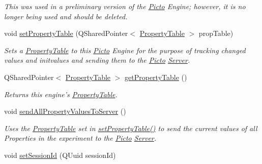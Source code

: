 \begin{DoxyCompactItemize}
\begin{DoxyCompactList}\small\item\em This was used in a preliminary version of the \hyperlink{namespace_picto}{Picto} Engine; however, it is no longer being used and should be deleted. \end{DoxyCompactList}\item 
\hypertarget{class_picto_1_1_engine_1_1_picto_engine_ac37ea79f55d34b89e4fa12ef68140f48}{void \hyperlink{class_picto_1_1_engine_1_1_picto_engine_ac37ea79f55d34b89e4fa12ef68140f48}{set\-Property\-Table} (Q\-Shared\-Pointer$<$ \hyperlink{class_picto_1_1_property_table}{Property\-Table} $>$ prop\-Table)}\label{class_picto_1_1_engine_1_1_picto_engine_ac37ea79f55d34b89e4fa12ef68140f48}

\begin{DoxyCompactList}\small\item\em Sets a \hyperlink{class_picto_1_1_property_table}{Property\-Table} to this \hyperlink{namespace_picto}{Picto} Engine for the purpose of tracking changed values and initvalues and sending them to the \hyperlink{namespace_picto}{Picto} \hyperlink{class_server}{Server}. \end{DoxyCompactList}\item 
Q\-Shared\-Pointer$<$ \hyperlink{class_picto_1_1_property_table}{Property\-Table} $>$ \hyperlink{class_picto_1_1_engine_1_1_picto_engine_a02ef204e6072d4186fbe7e8a50626e7c}{get\-Property\-Table} ()
\begin{DoxyCompactList}\small\item\em Returns this engine's \hyperlink{class_picto_1_1_property_table}{Property\-Table}. \end{DoxyCompactList}\item 
\hypertarget{class_picto_1_1_engine_1_1_picto_engine_a931c6fecf6f88d1f80849069d286c606}{void \hyperlink{class_picto_1_1_engine_1_1_picto_engine_a931c6fecf6f88d1f80849069d286c606}{send\-All\-Property\-Values\-To\-Server} ()}\label{class_picto_1_1_engine_1_1_picto_engine_a931c6fecf6f88d1f80849069d286c606}

\begin{DoxyCompactList}\small\item\em Uses the \hyperlink{class_picto_1_1_property_table}{Property\-Table} set in \hyperlink{class_picto_1_1_engine_1_1_picto_engine_ac37ea79f55d34b89e4fa12ef68140f48}{set\-Property\-Table()} to send the current values of all Properties in the experiment to the \hyperlink{namespace_picto}{Picto} \hyperlink{class_server}{Server}. \end{DoxyCompactList}\item 
\hypertarget{class_picto_1_1_engine_1_1_picto_engine_a1039a5795dee639babc47af9c7356f27}{void \hyperlink{class_picto_1_1_engine_1_1_picto_engine_a1039a5795dee639babc47af9c7356f27}{set\-Session\-Id} (Q\-Uuid session\-Id)}\label{class_picto_1_1_engine_1_1_picto_engine_a1039a5795dee639babc47af9c7356f27}


\end{DoxyCompactItemize}
